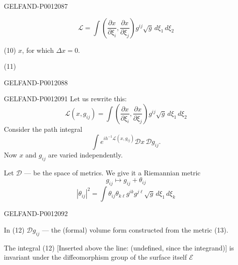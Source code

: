 \begin{GelfandAdjacentEvidence}{GELFAND-P001208}{7}


\begin{equation*}
\mathcal L=\int\left(\frac{\partial x}{\partial\xi_i},
\frac{\partial x}{\partial\xi_j}\right)g^{ij}\sqrt g\,d\xi_1\,d\xi_2
\tag{9}
\end{equation*}

(10)\quad {} \(x\), for which \(\Delta x=0\).

(11)\quad {}
\end{GelfandAdjacentEvidence}
\begin{GelfandAdjacentEvidence}{GELFAND-P001208}{8}

\end{GelfandAdjacentEvidence}



\begin{GelfandAdjacentEvidence}{GELFAND-P001209}{1}
Let us rewrite this:
\begin{equation*}
\mathcal L(x,g_{ij})=
\int\left(\frac{\partial x}{\partial\xi_i},\frac{\partial x}{\partial\xi_j}\right)
g^{ij}\sqrt g\,d\xi_1\,d\xi_2 \tag{9'}
\end{equation*}
Consider the path integral
\begin{equation*}
\int e^{ih^{-1}\mathcal L(x,g_{ij})}\mathcal D x\,\mathcal D g_{ij}. \tag{12}
\end{equation*}
Now \(x\) and \(g_{ij}\) are varied independently.

Let \(\mathcal D\) --- be the space of metrics. We give it a Riemannian metric
\[
g_{ij}\longmapsto g_{ij}+\theta_{ij}
\]
\begin{equation*}
|\theta_{ij}|^2=\int\theta_{ij}\theta_{k\ell}g^{ik}g^{j\ell}\sqrt g\,d\xi_1\,d\xi_k
\tag{13}
\end{equation*}
\end{GelfandAdjacentEvidence}
\begin{GelfandAdjacentEvidence}{GELFAND-P001209}{2}


In (12) \(\mathcal D g_{ij}\) --- the (formal) volume form constructed from the metric (13).

The integral (12) [Inserted above the line: (undefined, since the integrand)] is invariant under the diffeomorphism group of the surface itself \(\mathcal E\)
\end{GelfandAdjacentEvidence}


